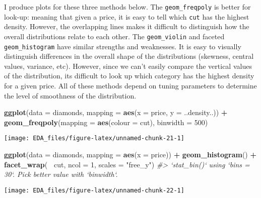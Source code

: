 \documentclass[]{book}
\newenvironment{Shaded}{\begin{snugshade}}{\end{snugshade}}
\newcommand{\CommentTok}[1]{\textcolor[rgb]{0.56,0.35,0.01}{\textit{#1}}}
\newcommand{\DataTypeTok}[1]{\textcolor[rgb]{0.13,0.29,0.53}{#1}}
\newcommand{\DecValTok}[1]{\textcolor[rgb]{0.00,0.00,0.81}{#1}}
\newcommand{\KeywordTok}[1]{\textcolor[rgb]{0.13,0.29,0.53}{\textbf{#1}}}
\newcommand{\NormalTok}[1]{#1}
\newcommand{\OperatorTok}[1]{\textcolor[rgb]{0.81,0.36,0.00}{\textbf{#1}}}
\newcommand{\StringTok}[1]{\textcolor[rgb]{0.31,0.60,0.02}{#1}}
\theoremstyle{definition}
\theoremstyle{definition}
\theoremstyle{definition}
\theoremstyle{remark}
\begin{document}
I produce plots for these three methods below. The
\texttt{geom\_freqpoly} is better for look-up: meaning that given a
price, it is easy to tell which \texttt{cut} has the highest density.
However, the overlapping lines makes it difficult to distinguish how the
overall distributions relate to each other. The \texttt{geom\_violin}
and faceted \texttt{geom\_histogram} have similar strengths and
weaknesses. It is easy to visually distinguish differences in the
overall shape of the distributions (skewness, central values, variance,
etc). However, since we can't easily compare the vertical values of the
distribution, its difficult to look up which category has the highest
density for a given price. All of these methods depend on tuning
parameters to determine the level of smoothness of the distribution.

\begin{Shaded}
\begin{Highlighting}[]
\KeywordTok{ggplot}\NormalTok{(}\DataTypeTok{data =}\NormalTok{ diamonds, }\DataTypeTok{mapping =} \KeywordTok{aes}\NormalTok{(}\DataTypeTok{x =}\NormalTok{ price, }\DataTypeTok{y =}\NormalTok{ ..density..)) }\OperatorTok{+}
\StringTok{  }\KeywordTok{geom_freqpoly}\NormalTok{(}\DataTypeTok{mapping =} \KeywordTok{aes}\NormalTok{(}\DataTypeTok{colour =}\NormalTok{ cut), }\DataTypeTok{binwidth =} \DecValTok{500}\NormalTok{)}
\end{Highlighting}
\end{Shaded}

\begin{center}\texttt{[image: EDA\_files/figure-latex/unnamed-chunk-21-1]} \end{center}

\begin{Shaded}
\begin{Highlighting}[]
\KeywordTok{ggplot}\NormalTok{(}\DataTypeTok{data =}\NormalTok{ diamonds, }\DataTypeTok{mapping =} \KeywordTok{aes}\NormalTok{(}\DataTypeTok{x =}\NormalTok{ price)) }\OperatorTok{+}
\StringTok{  }\KeywordTok{geom_histogram}\NormalTok{() }\OperatorTok{+}
\StringTok{  }\KeywordTok{facet_wrap}\NormalTok{(}\OperatorTok{~}\StringTok{ }\NormalTok{cut, }\DataTypeTok{ncol =} \DecValTok{1}\NormalTok{, }\DataTypeTok{scales =} \StringTok{"free_y"}\NormalTok{)}
\CommentTok{#> `stat_bin()` using `bins = 30`. Pick better value with `binwidth`.}
\end{Highlighting}
\end{Shaded}

\begin{center}\texttt{[image: EDA\_files/figure-latex/unnamed-chunk-22-1]} \end{center}
\end{document}
